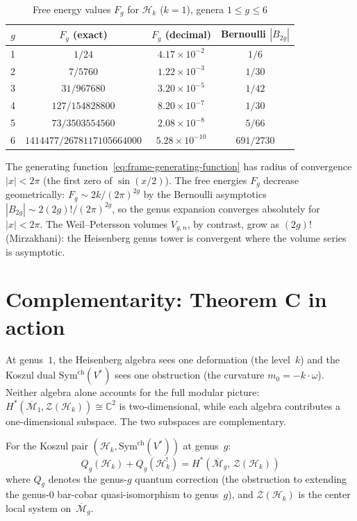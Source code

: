 \begin{table}[ht]
\centering
\caption{Free energy values $F_g$ for $\mathcal{H}_k$ ($k = 1$),
genera $1 \leq g \leq 6$}
\label{tab:frame-free-energy}
\begin{tabular}{|c|c|c|c|}
\hline
$g$ & $F_g$ (exact) & $F_g$ (decimal) &
 Bernoulli $|B_{2g}|$ \\
\hline
1 & $1/24$ & $4.17 \times 10^{-2}$ & $1/6$ \\
2 & $7/5760$ & $1.22 \times 10^{-3}$ & $1/30$ \\
3 & $31/967680$ & $3.20 \times 10^{-5}$ & $1/42$ \\
4 & $127/154828800$ & $8.20 \times 10^{-7}$ & $1/30$ \\
5 & $73/3503554560$ & $2.08 \times 10^{-8}$ & $5/66$ \\
6 & $1414477/2678117105664000$ & $5.28 \times 10^{-10}$ &
$691/2730$ \\
\hline
\end{tabular}
\end{table}

The generating function~\eqref{eq:frame-generating-function} has
radius of convergence $|x| < 2\pi$ (the first zero of $\sin(x/2)$).
The free energies $F_g$ decrease geometrically:
$F_g \sim 2k/(2\pi)^{2g}$ by the Bernoulli asymptotics
$|B_{2g}| \sim 2(2g)!/(2\pi)^{2g}$, so the genus expansion
converges absolutely for $|x| < 2\pi$. The Weil--Petersson
volumes $V_{g,n}$, by contrast, grow as $(2g)!$
(Mirzakhani): the Heisenberg genus tower
is convergent where the volume series is asymptotic.

\section{Complementarity: Theorem C in action}
\label{sec:frame-complementarity}

At genus~$1$, the Heisenberg algebra sees one deformation (the
level~$k$) and the Koszul dual $\mathrm{Sym}^{\mathrm{ch}}(V^*)$
sees one obstruction (the curvature $m_0 = -k \cdot \omega$).
Neither algebra alone accounts for the full modular picture:
$H^*(\overline{\mathcal{M}}_1, \mathcal{Z}(\mathcal{H}_k))
\cong \mathbb{C}^2$ is two-dimensional, while each algebra
contributes a one-dimensional subspace. The two subspaces are
complementary.

\begin{theorem}
\label{thm:frame-complementarity}
For the Koszul pair
$(\mathcal{H}_k, \mathrm{Sym}^{\mathrm{ch}}(V^*))$
at genus~$g$:
\begin{equation}\label{eq:frame-complementarity}
Q_g(\mathcal{H}_k) + Q_g(\mathcal{H}_k^!)
= H^*(\overline{\mathcal{M}}_g,\, \mathcal{Z}(\mathcal{H}_k))
\end{equation}
where $Q_g$ denotes the genus-$g$ quantum correction (the
obstruction to extending the genus-$0$ bar-cobar
quasi-isomorphism to genus~$g$), and $\mathcal{Z}(\mathcal{H}_k)$
is the center local system on~$\overline{\mathcal{M}}_g$.
\end{theorem}

